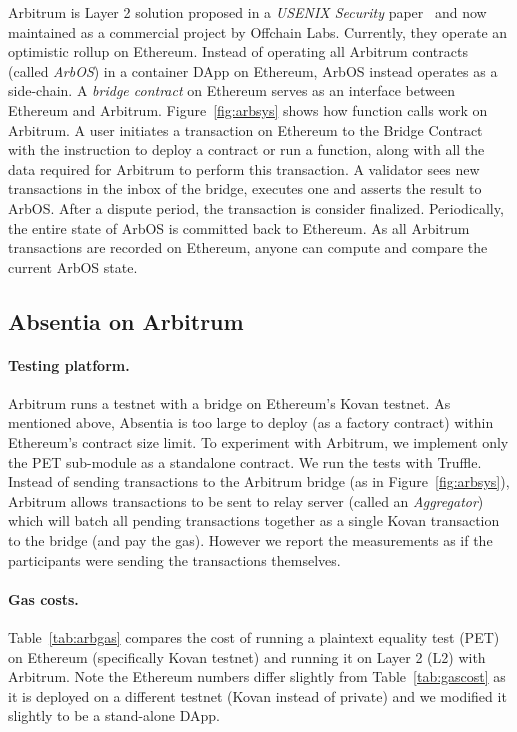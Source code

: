Arbitrum is Layer 2 solution proposed in a \textit{USENIX Security} paper~\cite{KGCWF18} and now maintained as a commercial project by Offchain Labs. Currently, they operate an optimistic rollup on Ethereum. Instead of operating all Arbitrum contracts (called \emph{ArbOS}) in a container DApp on Ethereum, ArbOS instead operates as a side-chain. A  \emph{bridge contract} on Ethereum serves as an interface between Ethereum and Arbitrum. Figure~\ref{fig:arbsys} shows how function calls work on Arbitrum. A user initiates a transaction on Ethereum to the Bridge Contract with the instruction to deploy a contract or run a function, along with all the data required for Arbitrum to perform this transaction. A validator sees new transactions in the inbox of the bridge, executes one and asserts the result to ArbOS. After a dispute period, the transaction is consider finalized. Periodically, the entire state of ArbOS is committed back to Ethereum. As all Arbitrum transactions are recorded on Ethereum, anyone can compute and compare the current ArbOS state.  

\subsection{Absentia on Arbitrum}

\paragraph{Testing platform.} Arbitrum runs a testnet with a bridge on Ethereum's Kovan testnet. As mentioned above, Absentia is too large to deploy (as a factory contract) within Ethereum's contract size limit. To experiment with Arbitrum, we implement only the PET sub-module as a standalone contract. We run the tests with Truffle. Instead of sending transactions to the Arbitrum bridge (as in Figure~\ref{fig:arbsys}), Arbitrum allows transactions to be sent to relay server (called an \emph{Aggregator}) which will batch all pending transactions together as a single Kovan transaction to the bridge (and pay the gas). However we report the measurements as if the participants were sending the transactions themselves.



\paragraph{Gas costs.} Table~\ref{tab:arbgas} compares the cost of running a plaintext equality test (PET) on Ethereum (specifically Kovan testnet) and running it on Layer 2 (L2) with Arbitrum. Note the Ethereum numbers differ slightly from Table~\ref{tab:gascost} as it is deployed on a different testnet (Kovan instead of private) and we modified it slightly to be a stand-alone DApp.

